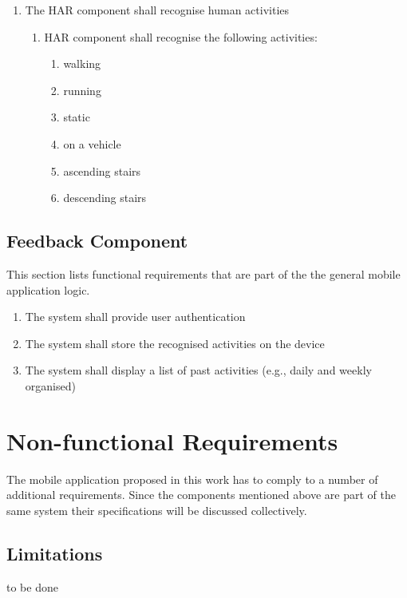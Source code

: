     \begin{enumerate}
        \item The HAR component shall recognise human activities
        \begin{enumerate}
            \item HAR component shall recognise the following activities:
            \begin{enumerate}
                \item walking
                \item running
                \item static
                \item on a vehicle
                \item ascending stairs
                \item descending stairs
            \end{enumerate}
        \end{enumerate}
    \end{enumerate}
    
    \subsection{Feedback Component}
    This section lists functional requirements that are part of the the general mobile application logic.
    \begin{enumerate}
        \item The system shall provide user authentication
        \item The system shall store the recognised activities on the device
        \item The system shall display a list of past activities (e.g., daily and weekly organised)
    \end{enumerate}

\section{Non-functional Requirements}
The mobile application proposed in this work has to comply to a number of additional requirements. Since the components mentioned above are part of the same system their specifications will be discussed collectively.

    \subsection{Limitations}
    to be done
    
